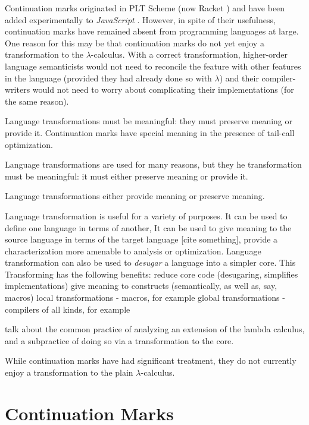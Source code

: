 \documentclass{llncs}
\newcommand{\lc}[0]{$\lambda$-calculus}
\begin{document}
Continuation marks originated in PLT Scheme (now Racket \cite{plt-tr1}) and have been added experimentally to \emph{JavaScript} \cite{clements2008implementing}. However, in spite of their usefulness, continuation marks have remained absent from programming languages at large. One reason for this may be that continuation marks do not yet enjoy a transformation to the \lc. With a correct transformation, higher-order language semanticists would not need to reconcile the feature with other features in the language (provided they had already done so with $\lambda$) and their compiler-writers would not need to worry about complicating their implementations (for the same reason).



Language transformations must be meaningful: they must preserve meaning or provide it. Continuation marks have special meaning in the presence of tail-call optimization.

Language transformations are used for many reasons, but they he transformation must be meaningful: it must either preserve meaning or provide it.

Language transformations either provide meaning or preserve meaning.

Language transformation is useful for a variety of purposes. It can be used to define one language in terms of another, It can be used to give meaning to the source language in terms of the target language [cite something], provide a characterization more amenable to analysis or optimization. Language transformation can also be used to \emph{desugar} a language into a simpler core. This 
Transforming has the following benefits:
reduce core code (desugaring, simplifies implementations)
give meaning to constructs (semantically, as well as, say, macros)
local transformations - macros, for example
global transformations - compilers of all kinds, for example

talk about the common practice of analyzing an extension of the lambda calculus, and a subpractice of doing so via a transformation to the core.

While continuation marks have had significant treatment, they do not currently enjoy a transformation to the plain $\lambda$-calculus.

\section{Continuation Marks}
\end{document}

